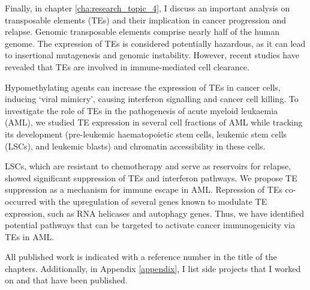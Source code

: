 Finally, in chapter \ref{cha:research_topic_4}, I discuss an important analysis on transposable elements (TEs) and their implication in cancer progression and relapse. Genomic transposable elements comprise nearly half of the human genome. The expression of TEs is considered potentially hazardous, as it can lead to insertional mutagenesis and genomic instability. However, recent studies have revealed that TEs are involved in immune-mediated cell clearance. 

Hypomethylating agents can increase the expression of TEs in cancer cells, inducing `viral mimicry', causing interferon signalling and cancer cell killing. To investigate the role of TEs in the pathogenesis of acute myeloid leukaemia (AML), we studied TE expression in several cell fractions of AML while tracking its development (pre-leukemic haematopoietic stem cells, leukemic stem cells (LSCs), and leukemic blasts) and chromatin accessibility in these cells. 

LSCs, which are resistant to chemotherapy and serve as reservoirs for relapse, showed significant suppression of TEs and interferon pathways. We propose TE suppression as a mechanism for immune escape in AML. Repression of TEs co-occurred with the upregulation of several genes known to modulate TE expression, such as RNA helicases and autophagy genes. Thus, we have identified potential pathways that can be targeted to activate cancer immunogenicity via TEs in AML.

All published work is indicated with a reference number in the title of the chapters. Additionally, in Appendix \ref{appendix}, I list side projects that I worked on and that have been published. 